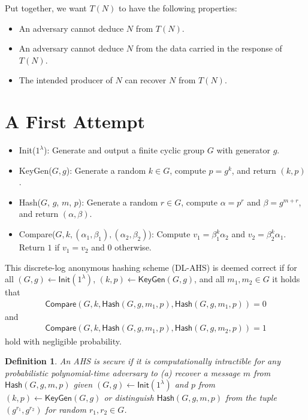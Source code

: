 \documentclass{article}
\newtheorem{defn}{Definition}
\begin{document}
Put together, we want $T(N)$ to have the following properties:
\begin{itemize}
    \item An adversary cannot deduce $N$ from $T(N)$.
    \item An adversary cannot deduce $N$ from the data carried in the response of $T(N)$.
    \item The intended producer of $N$ can recover $N$ from $T(N)$.
\end{itemize}

\section{A First Attempt}


\begin{itemize}
    \item {\sf Init}($1^\lambda$): Generate and output a finite cyclic group $G$ with generator $g$.
    \item {\sf KeyGen}($G, g$): Generate a random $k \in G$, compute $p = g^k$, and return $(k, p)$.
    \item {\sf Hash}($G$, $g$, $m$, $p$): Generate a random $r \in G$, compute $\alpha = p^r$ and $\beta = g^{m + r}$,
    and return $(\alpha, \beta)$.
    \item {\sf Compare}($G, k, (\alpha_1, \beta_1), (\alpha_2, \beta_2)$): Compute $v_1 = \beta_1^k\alpha_2$ and $v_2 = \beta_2^k\alpha_1$. Return $1$ if $v_1 = v_2$ and $0$ otherwise.
\end{itemize}

This discrete-log anonymous hashing scheme (DL-AHS) is deemed correct if for all
$(G, g) \gets \mathsf{Init}(1^\lambda)$,
$(k, p) \gets \mathsf{KeyGen}(G, g)$, and all $m_1, m_2 \in G$ it holds that
\begin{align*}
\mathsf{Compare}(G, k, \mathsf{Hash}(G, g, m_1, p), \mathsf{Hash}(G, g, m_1, p)) = 0
\end{align*}
and
\begin{align*}
\mathsf{Compare}(G, k, \mathsf{Hash}(G, g, m_1, p), \mathsf{Hash}(G, g, m_2, p)) = 1
\end{align*}
hold with negligible probability.

\begin{defn}
An AHS is secure if it is computationally intractible for any probabilistic
polynomial-time adversary to (a) recover a message $m$ from $\mathsf{Hash}(G, g, m, p)$
given $(G, g) \gets \mathsf{Init}(1^\lambda)$ and $p$ from $(k, p) \gets \mathsf{KeyGen}(G, g)$
or distinguish $\mathsf{Hash}(G, g, m, p)$ from the tuple $(g^{r_1}, g^{r_2})$ for random
$r_1,r_2 \in G$.
\end{defn}
\end{document}
